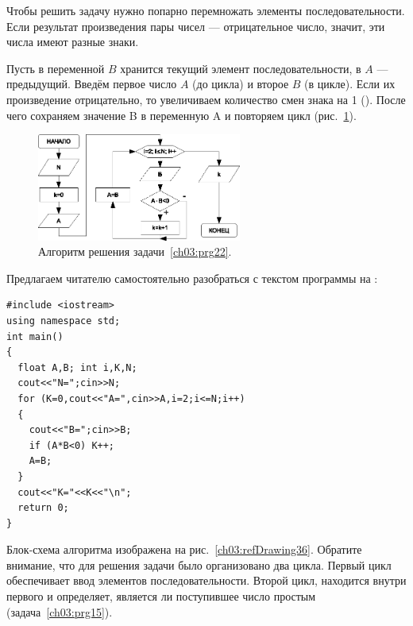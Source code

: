 
Чтобы решить задачу нужно попарно перемножать элементы последовательности. Если результат произведения пары чисел ---
отрицательное число, значит, эти числа имеют разные знаки. 

Пусть в переменной $B$ хранится текущий элемент последовательности, в $A$ --- предыдущий. Введём первое 
число $A$ (до цикла) и
второе $B$ (в цикле). Если их произведение отрицательно, то увеличиваем количество смен знака на 1 (). После чего
сохраняем значение B в переменную A и повторяем цикл (рис.~\ref{ch03:refDrawing35}).

\begin{figure}[htb]
\begin{center}
\includegraphics[width=0.6\textwidth]{img/ris_3_36}
\caption{Алгоритм решения задачи~\ref{ch03:prg22}.}
\label{ch03:refDrawing35}
\end{center}
\end{figure}

Предлагаем читателю самостоятельно разобраться с текстом программы на : 
\begin{lstlisting}
#include <iostream>
using namespace std;
int main()
{
  float A,B; int i,K,N;
  cout<<"N=";cin>>N;
  for (K=0,cout<<"A=",cin>>A,i=2;i<=N;i++)
  {
    cout<<"B=";cin>>B;
    if (A*B<0) K++;
    A=B;
  }
  cout<<"K="<<K<<"\n";
  return 0;
}
\end{lstlisting}



Блок-схема алгоритма изображена на рис.~\ref{ch03:refDrawing36}. Обратите внимание, что для решения задачи было организовано два
цикла. Первый цикл обеспечивает ввод элементов последовательности. Второй цикл, находится внутри первого и определяет,
является ли поступившее число простым (задача~\ref{ch03:prg15}).

